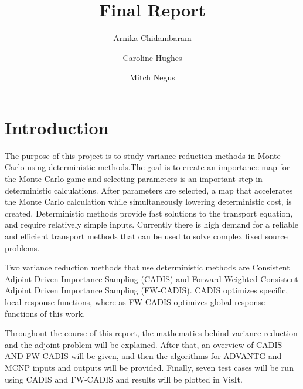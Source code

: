 \documentclass[10pt]{article}
\title{Final Report}
\author{Arnika Chidambaram \and Caroline Hughes \and Mitch Negus}
\begin{document}
\maketitle

\tableofcontents

\newpage
\section{Introduction}
\label{sec:intro}

The purpose of this project is to study variance reduction methods in Monte Carlo using deterministic methods.The goal is to create an importance map for the Monte Carlo game and selecting parameters is an important step in deterministic calculations. 
After parameters are selected, a map that accelerates the Monte Carlo calculation while simultaneously lowering deterministic cost, is created. Deterministic methods provide fast solutions to the transport equation, and require relatively simple inputs. Currently there is high demand for a reliable and efficient transport methods that can be used to solve complex fixed source problems\cite{slaybaugh:deterministic-parameter-study}.


Two variance reduction methods that use deterministic methods are Consistent Adjoint Driven Importance Sampling (CADIS) and Forward Weighted-Consistent Adjoint Driven Importance Sampling (FW-CADIS). CADIS optimizes specific, local response functions, where as FW-CADIS optimizes global response functions of this work. 

Throughout the course of this report, the mathematics behind variance reduction and the adjoint problem will be explained. After that, an overview of CADIS AND FW-CADIS will be given, and then the algorithms for ADVANTG and MCNP inputs and outputs will be provided. Finally, seven test cases will be run using CADIS and FW-CADIS and results will be plotted in VisIt. 


\end{document}
